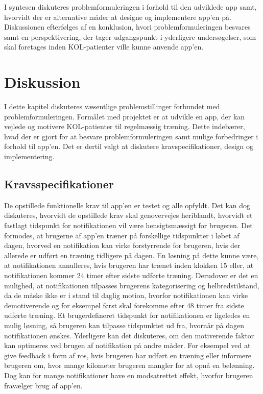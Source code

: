I syntesen diskuteres problemformuleringen i forhold til den udviklede app samt, hvorvidt der er alternative måder at designe og implementere app'en på. Diskussionen efterfølges af en konklusion, hvori problemformuleringen besvares samt en perspektivering, der tager udgangspunkt i yderligere undersøgelser, som skal foretages inden KOL-patienter ville kunne anvende app'en.

\section{Diskussion}
I dette kapitel diskuteres væsentlige problemstillinger forbundet med problemformuleringen. Formålet med projektet er at udvikle en app, der kan vejlede og motivere KOL-patienter til regelmæssig træning. Dette indebærer, hvad der er gjort for at besvare problemformuleringen samt mulige forbedringer i forhold til app'en. Det er dertil valgt at diskutere kravspecifikationer, design og implementering.

\subsection{Kravsspecifikationer}
De opstillede funktionelle krav til app’en er testet og alle opfyldt. Det kan dog diskuteres, hvorvidt de opstillede krav skal genovervejes heriblandt, hvorvidt et fastlagt tidspunkt for notifikationen vil være hensigtsmæssigt for brugeren. Det formodes, at brugerne af app’en træner på forskellige tidspunkter i løbet af dagen, hvorved en notifikation kan virke forstyrrende for brugeren, hvis der allerede er udført en træning tidligere på dagen. En løsning på dette kunne være, at notifikationen annulleres, hvis brugeren har trænet inden klokken 15 eller, at notifikationen kommer 24 timer efter sidste udførte træning. Derudover er det en mulighed, at notifikationen tilpasses brugerens kategorisering og helbredstilstand, da de måske ikke er i stand til daglig motion, hvorfor notifikationen kan virke demotiverende og for eksempel først skal forekomme efter 48 timer fra sidste udførte træning. Et brugerdefineret tidspunkt for notifikationen er ligeledes en mulig løsning, så brugeren kan tilpasse tidspunktet ud fra, hvornår på dagen notifikationen ønskes. 
Yderligere kan det diskuteres, om den motiverende faktor kan optimeres ved brugen af notifikation på andre måder. For eksempel ved at give feedback i form af ros, hvis brugeren har udført en træning eller informere brugeren om, hvor mange kilometer brugeren mangler for at opnå en belønning. Dog kan for mange notifikationer have en modsatrettet effekt, hvorfor brugeren fravælger brug af app’en.


